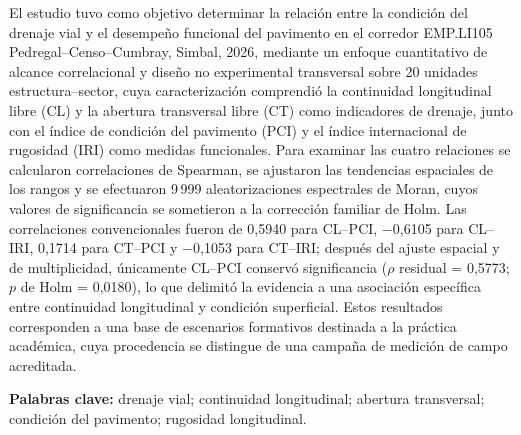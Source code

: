 



\begin{center}
\textbf{\tituloTesis}
\end{center}
El estudio tuvo como objetivo determinar la relación entre la condición del drenaje vial y el desempeño funcional del pavimento en el corredor EMP.LI105 Pedregal--Censo--Cumbray, Simbal, 2026, mediante un enfoque cuantitativo de alcance correlacional y diseño no experimental transversal sobre 20 unidades estructura--sector, cuya caracterización comprendió la continuidad longitudinal libre (CL) y la abertura transversal libre (CT) como indicadores de drenaje, junto con el índice de condición del pavimento (PCI) y el índice internacional de rugosidad (IRI) como medidas funcionales. Para examinar las cuatro relaciones se calcularon correlaciones de Spearman, se ajustaron las tendencias espaciales de los rangos y se efectuaron 9\,999 aleatorizaciones espectrales de Moran, cuyos valores de significancia se sometieron a la corrección familiar de Holm. Las correlaciones convencionales fueron de 0,5940 para CL--PCI, $-$0,6105 para CL--IRI, 0,1714 para CT--PCI y $-$0,1053 para CT--IRI; después del ajuste espacial y de multiplicidad, únicamente CL--PCI conservó significancia ($\rho$ residual = 0,5773; $p$ de Holm = 0,0180), lo que delimitó la evidencia a una asociación específica entre continuidad longitudinal y condición superficial. Estos resultados corresponden a una base de escenarios formativos destinada a la práctica académica, cuya procedencia se distingue de una campaña de medición de campo acreditada.

\noindent\textbf{Palabras clave:} drenaje vial; continuidad longitudinal; abertura transversal; condición del pavimento; rugosidad longitudinal.

